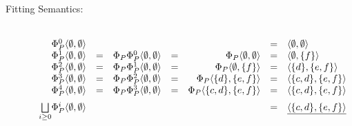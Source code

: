\begin{Loesung}
\begin{UList}
\begin{description}
 \item[Fitting Semantics:] ~\\
   \(
   \begin{array}[t]{rcrcrcl}
     \Phi^0_P\langle \emptyset,\emptyset\rangle & & & & & = &
     \langle\emptyset,\emptyset\rangle \\
     \Phi^1_P\langle \emptyset,\emptyset\rangle & = & 
     \Phi_P\Phi^0_P\langle \emptyset,\emptyset\rangle & = &
     \Phi_P\langle \emptyset,\emptyset\rangle & = & 
     \langle\emptyset,\{f\}\rangle \\
     \Phi^2_P\langle \emptyset,\emptyset\rangle & = & 
     \Phi_P\Phi^1_P\langle \emptyset,\emptyset\rangle & = &
     \Phi_P\langle \emptyset,\{f\}\rangle & = & 
     \langle\{d\},\{e,f\}\rangle \\
     \Phi^3_P\langle \emptyset,\emptyset\rangle & = & 
     \Phi_P\Phi^2_P\langle \emptyset,\emptyset\rangle & = &
     \Phi_P\langle \{d\},\{e,f\}\rangle & = & 
     \langle\{c,d\},\{e,f\}\rangle \\
     \Phi^4_P\langle \emptyset,\emptyset\rangle & = & 
     \Phi_P\Phi^3_P\langle \emptyset,\emptyset\rangle & = &
     \Phi_P\langle \{c,d\},\{e,f\}\rangle & = & 
     \langle\{c,d\},\{e,f\}\rangle \\[2mm]
     \underset{i\geq 0}{\bigsqcup}\Phi^i_P\langle \emptyset,\emptyset\rangle 
     & & & & & = & \underline{\langle\{c,d\},\{e,f\}\rangle}
   \end{array}
   \)


\end{description}
\end{UList}
\end{Loesung}
